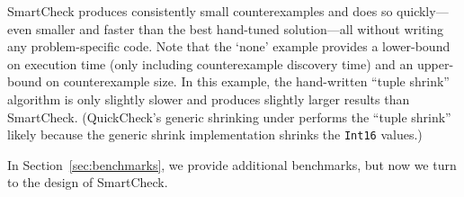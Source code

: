 \documentclass{sigplanconf}
\newenvironment{code}{\begin{alltt}\footnotesize}{\end{alltt}}
\newcommand{\ttp}[1]{\texttt{#1}}
\begin{document}
SmartCheck produces consistently small counterexamples and does so
quickly---even smaller and faster than the best hand-tuned solution---all
without writing any problem-specific code.  Note that the `none' example
provides a lower-bound on execution time (only including counterexample
discovery time) and an upper-bound on counterexample size.  In this example, the
hand-written ``tuple shrink'' algorithm is only slightly slower and produces
slightly larger results than SmartCheck.  (QuickCheck's generic shrinking under
performs the ``tuple shrink'' likely because the generic shrink implementation
shrinks the \ttp{Int16} values.)

In Section~\ref{sec:benchmarks}, we provide additional benchmarks, but now we
turn to the design of SmartCheck.




\end{document}
